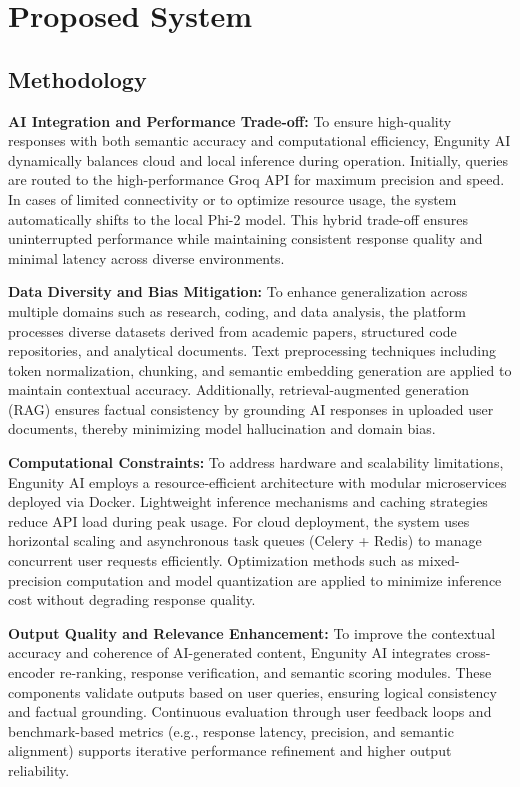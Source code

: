 \chapter{Proposed System}
\section{Methodology}

\textbf{AI Integration and Performance Trade-off:} To ensure high-quality responses with both semantic accuracy and computational efficiency, Engunity AI dynamically balances cloud and local inference during operation. Initially, queries are routed to the high-performance Groq API for maximum precision and speed. In cases of limited connectivity or to optimize resource usage, the system automatically shifts to the local Phi-2 model. This hybrid trade-off ensures uninterrupted performance while maintaining consistent response quality and minimal latency across diverse environments.

\textbf{Data Diversity and Bias Mitigation:} To enhance generalization across multiple domains such as research, coding, and data analysis, the platform processes diverse datasets derived from academic papers, structured code repositories, and analytical documents. Text preprocessing techniques including token normalization, chunking, and semantic embedding generation are applied to maintain contextual accuracy. Additionally, retrieval-augmented generation (RAG) ensures factual consistency by grounding AI responses in uploaded user documents, thereby minimizing model hallucination and domain bias.

\textbf{Computational Constraints:} To address hardware and scalability limitations, Engunity AI employs a resource-efficient architecture with modular microservices deployed via Docker. Lightweight inference mechanisms and caching strategies reduce API load during peak usage. For cloud deployment, the system uses horizontal scaling and asynchronous task queues (Celery + Redis) to manage concurrent user requests efficiently. Optimization methods such as mixed-precision computation and model quantization are applied to minimize inference cost without degrading response quality.

\textbf{Output Quality and Relevance Enhancement:} To improve the contextual accuracy and coherence of AI-generated content, Engunity AI integrates cross-encoder re-ranking, response verification, and semantic scoring modules. These components validate outputs based on user queries, ensuring logical consistency and factual grounding. Continuous evaluation through user feedback loops and benchmark-based metrics (e.g., response latency, precision, and semantic alignment) supports iterative performance refinement and higher output reliability.

